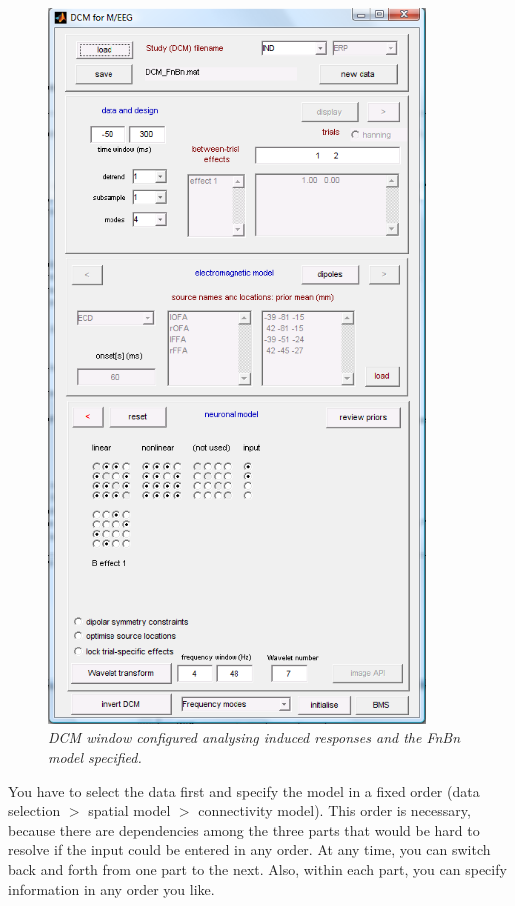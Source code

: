\begin{figure}
\begin{center}
\includegraphics[width=100mm]{dcm_ir/figures/irfigure1}
\caption{\em DCM window configured analysing induced responses and the FnBn model specified.\label{dcm-ir:fig:1}}
\end{center}
\end{figure}

You have to select the data first and specify the model in a fixed order (data selection $>$ spatial model $>$
connectivity model). This order is necessary, because there are dependencies among the three parts that would be hard to resolve
if the input could be entered in any order. At any time, you can switch back and forth from one part to the next. Also, within each part, you can specify information in any order you like.

